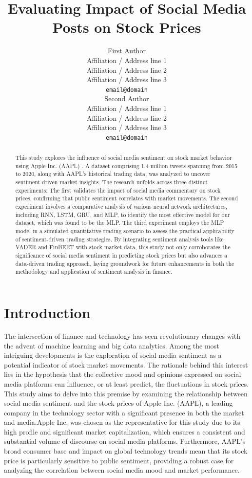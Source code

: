 \documentclass[11pt,a4paper]{article}
\title{Evaluating Impact of Social Media Posts 
on Stock Prices
}
\author{First Author \\
  Affiliation / Address line 1 \\
  Affiliation / Address line 2 \\
  Affiliation / Address line 3 \\
  \texttt{email@domain} \\\And
  Second Author \\
  Affiliation / Address line 1 \\
  Affiliation / Address line 2 \\
  Affiliation / Address line 3 \\
  \texttt{email@domain} \\}
\date{}
\begin{document}
\maketitle
\begin{abstract}
  This study explores the influence of social media sentiment on stock market behavior using Apple Inc. (AAPL) . A dataset comprising 1.4 million tweets spanning from 2015 to 2020, along with AAPL's historical trading data, was analyzed to uncover sentiment-driven market insights. The research unfolds across three distinct experiments: The first validates the impact of social media commentary on stock prices, confirming that public sentiment correlates with market movements. The second experiment involves a comparative analysis of various neural network architectures, including RNN, LSTM, GRU, and MLP, to identify the most effective model for our dataset, which was found to be the MLP. The third experiment employs the MLP model in a simulated quantitative trading scenario to assess the practical applicability of sentiment-driven trading strategies. By integrating sentiment analysis tools like VADER and FinBERT with stock market data, this study not only corroborates the significance of social media sentiment in predicting stock prices but also advances a data-driven trading approach, laying groundwork for future enhancements in both the methodology and application of sentiment analysis in finance.
\end{abstract}


\section{Introduction}

The intersection of finance and technology has seen revolutionary changes with the advent of machine learning and big data analytics. Among the most intriguing developments is the exploration of social media sentiment as a potential indicator of stock market movements. The rationale behind this interest lies in the hypothesis that the collective mood and opinions expressed on social media platforms can influence, or at least predict, the fluctuations in stock prices. This study aims to delve into this premise by examining the relationship between social media sentiment and the stock prices of Apple Inc. (AAPL), a leading company in the technology sector with a significant presence in both the market and media.Apple Inc. was chosen as the  representative for this study due to its high profile and significant market capitalization, which ensures a consistent and substantial volume of discourse on social media platforms. Furthermore, AAPL's broad consumer base and impact on global technology trends mean that its stock price is particularly sensitive to public sentiment, providing a robust case for analyzing the correlation between social media mood and market performance.
\end{document}
